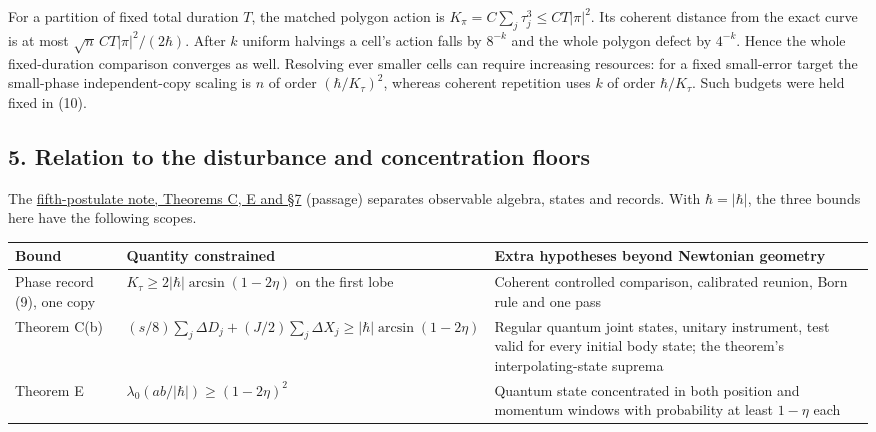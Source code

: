 \documentclass[11pt,a4paper]{article}
\begin{document}
For a partition of fixed total duration \(T\), the matched polygon
action is \(K_\pi=C\sum_j\tau_j^3\le CT|\pi|^2\). Its coherent distance
from the exact curve is at most \(\sqrt n\,CT|\pi|^2/(2\hbar)\). After
\(k\) uniform halvings a cell's action falls by \(8^{-k}\) and the whole
polygon defect by \(4^{-k}\). Hence the whole fixed-duration comparison
converges as well. Resolving ever smaller cells can require increasing
resources: for a fixed small-error target the small-phase
independent-copy scaling is \(n\) of order \((\hbar/K_\tau)^2\), whereas
coherent repetition uses \(k\) of order \(\hbar/K_\tau\). Such budgets
were held fixed in (10).

\subsection{5. Relation to the disturbance and concentration
floors}\label{relation-to-the-disturbance-and-concentration-floors}

The \href{principia-fifth-postulate.md}{fifth-postulate note, Theorems
C, E and §7} (passage) separates observable algebra, states and records.
With \(\hbar=|\hbar|\), the three bounds here have the following scopes.

\begin{longtable}[]{@{}
  >{\raggedright\arraybackslash}p{}
  >{\raggedright\arraybackslash}p{}
  >{\raggedright\arraybackslash}p{}@{}}
\toprule\noalign{}
\begin{minipage}[b]{\linewidth}\raggedright
Bound
\end{minipage} & \begin{minipage}[b]{\linewidth}\raggedright
Quantity constrained
\end{minipage} & \begin{minipage}[b]{\linewidth}\raggedright
Extra hypotheses beyond Newtonian geometry
\end{minipage} \\
\midrule\noalign{}
\endhead
\bottomrule\noalign{}
\endlastfoot
Phase record (9), one copy & \(K_\tau\ge2|\hbar|\arcsin(1-2\eta)\) on
the first lobe & Coherent controlled comparison, calibrated reunion,
Born rule and one pass \\
Theorem C(b) &
\((s/8)\sum_j\Delta D_j+(J/2)\sum_j\Delta X_j\ge|\hbar|\arcsin(1-2\eta)\)
& Regular quantum joint states, unitary instrument, test valid for every
initial body state; the theorem's interpolating-state suprema \\
Theorem E & \(\lambda_0(ab/|\hbar|)\ge(1-2\eta)^2\) & Quantum state
concentrated in both position and momentum windows with probability at
least \(1-\eta\) each \\
\end{longtable}
\end{document}
